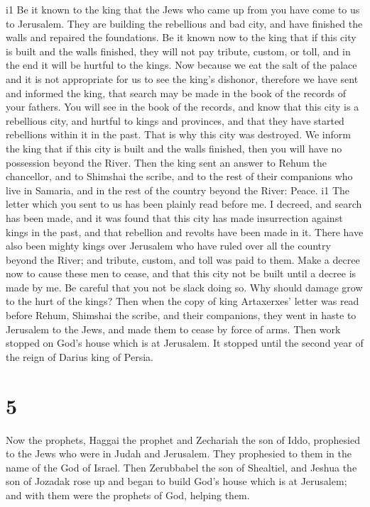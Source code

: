 i1 Be it known to the king that the Jews who came up from
you have come to us to Jerusalem. They are building the rebellious and
bad city, and have finished the walls and repaired the foundations.
 Be it known now to the king that if this city is built
and the walls finished, they will not pay tribute, custom, or toll, and
in the end it will be hurtful to the kings.  Now because
we eat the salt of the palace and it is not appropriate for us to see
the king's dishonor, therefore we have sent and informed the king,
 that search may be made in the book of the records of
your fathers. You will see in the book of the records, and know that
this city is a rebellious city, and hurtful to kings and provinces, and
that they have started rebellions within it in the past. That is why
this city was destroyed.  We inform the king that if this
city is built and the walls finished, then you will have no possession
beyond the River.  Then the king sent an answer to Rehum
the chancellor, and to Shimshai the scribe, and to the rest of their
companions who live in Samaria, and in the rest of the country beyond
the River: Peace. i1 The letter which you sent to us has
been plainly read before me.  I decreed, and search has
been made, and it was found that this city has made insurrection against
kings in the past, and that rebellion and revolts have been made in it.
 There have also been mighty kings over Jerusalem who
have ruled over all the country beyond the River; and tribute, custom,
and toll was paid to them.  Make a decree now to cause
these men to cease, and that this city not be built until a decree is
made by me.  Be careful that you not be slack doing so.
Why should damage grow to the hurt of the kings?  Then
when the copy of king Artaxerxes' letter was read before Rehum, Shimshai
the scribe, and their companions, they went in haste to Jerusalem to the
Jews, and made them to cease by force of arms.  Then work
stopped on God's house which is at Jerusalem. It stopped until the
second year of the reign of Darius king of Persia.

\hypertarget{section-4}{%
\section{5}\label{section-4}}

 Now the prophets, Haggai the prophet and Zechariah the
son of Iddo, prophesied to the Jews who were in Judah and Jerusalem.
They prophesied to them in the name of the God of Israel. 
Then Zerubbabel the son of Shealtiel, and Jeshua the son of Jozadak rose
up and began to build God's house which is at Jerusalem; and with them
were the prophets of God, helping them.


